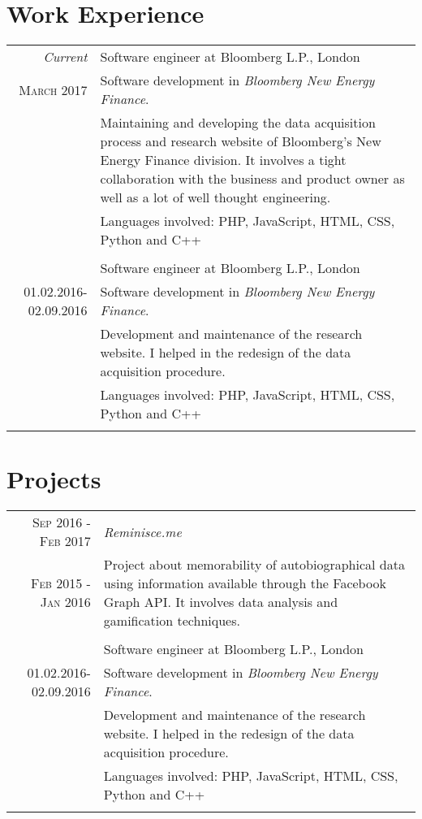 \documentclass[a4paper,10pt]{article}
\begin{document}
\section{Work Experience}
\begin{tabular}{r|p{11cm}}
	\emph{Current} & \large{Software engineer at Bloomberg L.P., London} \\
	\textsc{March 2017}&Software development in \emph{Bloomberg New Energy Finance}.\\
	&Maintaining and developing the data acquisition process and research website of Bloomberg's New Energy Finance division. It involves a tight collaboration with the business and product owner as well as a lot of well thought engineering.\\
	&Languages involved: PHP, JavaScript, HTML, CSS, Python and C++\\\multicolumn{2}{c}{} \\
	& \large{Software engineer at Bloomberg L.P., London} \\
	\textsc{01.02.2016-02.09.2016}&Software development in \emph{Bloomberg New Energy Finance}.\\
	&Development and maintenance of the research website. I helped in the redesign of the data acquisition procedure.\\
	&Languages involved: PHP, JavaScript, HTML, CSS, Python and C++\\\multicolumn{2}{c}{} \\
\end{tabular}

\section{Projects}
\begin{tabular}{r|p{11cm}}
	\textsc{Sep 2016 - Feb 2017}&\emph{Reminisce.me} \\
	\textsc{Feb 2015 - Jan 2016}&Project about memorability of autobiographical data using information
available through the Facebook Graph API. It involves data analysis and gamification techniques. \\\multicolumn{2}{c}{} \\
	& \large{Software engineer at Bloomberg L.P., London} \\
	\textsc{01.02.2016-02.09.2016}&Software development in \emph{Bloomberg New Energy Finance}.\\
	&Development and maintenance of the research website. I helped in the redesign of the data acquisition procedure.\\
	&Languages involved: PHP, JavaScript, HTML, CSS, Python and C++\\\multicolumn{2}{c}{} \\
\end{tabular}
\end{document}
